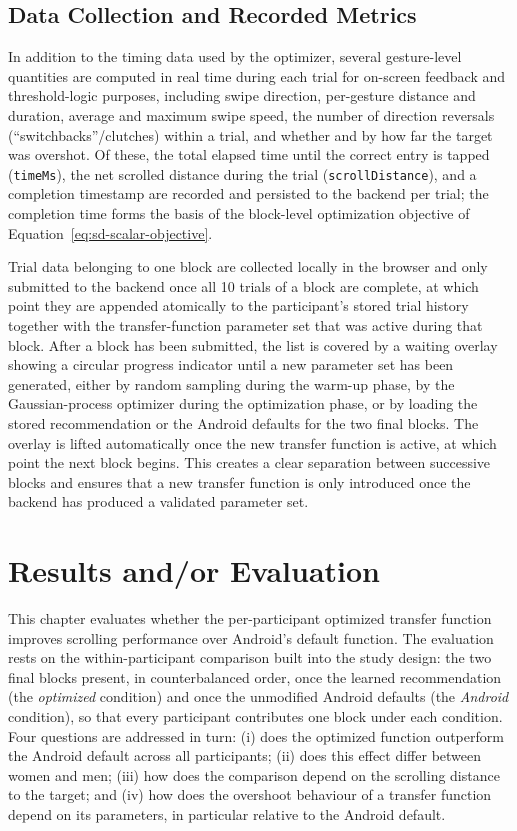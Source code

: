\documentclass[12pt,a4paper]{report}
\begin{document}
        \section{Data Collection and Recorded Metrics}
        \label{sec:data-collection}

        In addition to the timing data used by the optimizer, several gesture-level quantities are computed in real time during each trial for on-screen feedback and threshold-logic purposes, including swipe direction, per-gesture distance and duration, average and maximum swipe speed, the number of direction reversals (``switchbacks''/clutches) within a trial, and whether and by how far the target was overshot. Of these, the total elapsed time until the correct entry is tapped (\texttt{timeMs}), the net scrolled distance during the trial (\texttt{scrollDistance}), and a completion timestamp are recorded and persisted to the backend per trial; the completion time forms the basis of the block-level optimization objective of Equation~\eqref{eq:sd-scalar-objective}.

        Trial data belonging to one block are collected locally in the browser and only submitted to the backend once all 10 trials of a block are complete, at which point they are appended atomically to the participant's stored trial history together with the transfer-function parameter set that was active during that block. After a block has been submitted, the list is covered by a waiting overlay showing a circular progress indicator until a new parameter set has been generated, either by random sampling during the warm-up phase, by the Gaussian-process optimizer during the optimization phase, or by loading the stored recommendation or the Android defaults for the two final blocks. The overlay is lifted automatically once the new transfer function is active, at which point the next block begins. This creates a clear separation between successive blocks and ensures that a new transfer function is only introduced once the backend has produced a validated parameter set.

        \chapter{Results and/or Evaluation}

        This chapter evaluates whether the per-participant optimized transfer function improves scrolling performance over Android's default function. The evaluation rests on the within-participant comparison built into the study design: the two final blocks present, in counterbalanced order, once the learned recommendation (the \emph{optimized} condition) and once the unmodified Android defaults (the \emph{Android} condition), so that every participant contributes one block under each condition. Four questions are addressed in turn: (i) does the optimized function outperform the Android default across all participants; (ii) does this effect differ between women and men; (iii) how does the comparison depend on the scrolling distance to the target; and (iv) how does the overshoot behaviour of a transfer function depend on its parameters, in particular relative to the Android default.
\end{document}

